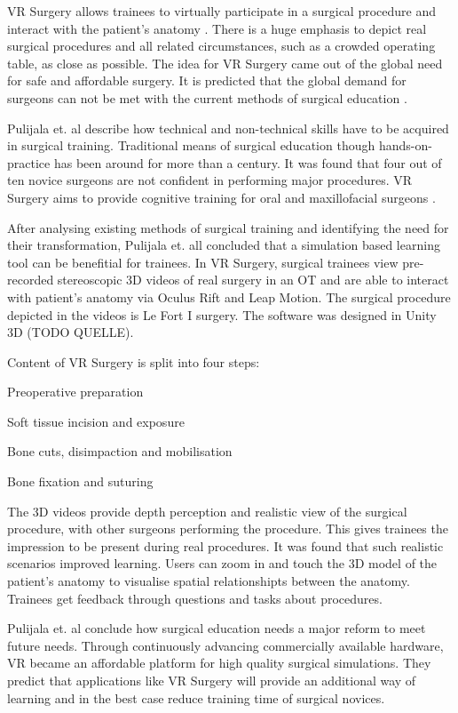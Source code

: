 VR Surgery allows trainees to virtually participate in a surgical procedure and interact with the patient's anatomy \cite{RN6}.
There is a huge emphasis to depict real surgical procedures and all related circumstances, such as a crowded operating table, as close as possible.
The idea for VR Surgery came out of the global need for safe and affordable surgery.
It is predicted that the global demand for surgeons can not be met with the current methods of surgical education \cite{RN68}.

Pulijala et. al describe how technical and non-technical skills have to be acquired in surgical training.
Traditional means of surgical education though hands-on-practice has been around for more than a century.
It was found that four out of ten novice surgeons are not confident in performing major procedures.
VR Surgery aims to provide cognitive training for oral and maxillofacial surgeons \cite{RN68}.

After analysing existing methods of surgical training and identifying the need for their transformation,
Pulijala et. all concluded that a simulation based learning tool can be benefitial for trainees.
In VR Surgery, surgical trainees view pre-recorded stereoscopic 3D videos of real surgery in an OT and are able to interact with patient's anatomy via Oculus Rift and Leap Motion.
The surgical procedure depicted in the videos is Le Fort I surgery.
The software was designed in Unity 3D (TODO QUELLE).

Content of VR Surgery is split into four steps:
\begin{compactenum}[label=(\alph*)]
    \item Preoperative preparation
    \item Soft tissue incision and exposure
    \item Bone cuts, disimpaction and mobilisation
    \item Bone fixation and suturing
\end{compactenum}

The 3D videos provide depth perception and realistic view of the surgical procedure, with other surgeons performing the procedure.
This gives trainees the impression to be present during real procedures. It was found that such realistic scenarios improved learning.
Users can zoom in and touch the 3D model of the patient's anatomy to visualise spatial relationshipts between the anatomy.
Trainees get feedback through questions and tasks about procedures.

Pulijala et. al conclude how surgical education needs a major reform to meet future needs.
Through continuously advancing commercially available hardware, VR became an affordable platform for high quality surgical simulations.
They predict that applications like VR Surgery will provide an additional way of learning and in the best case reduce training time of surgical novices.

